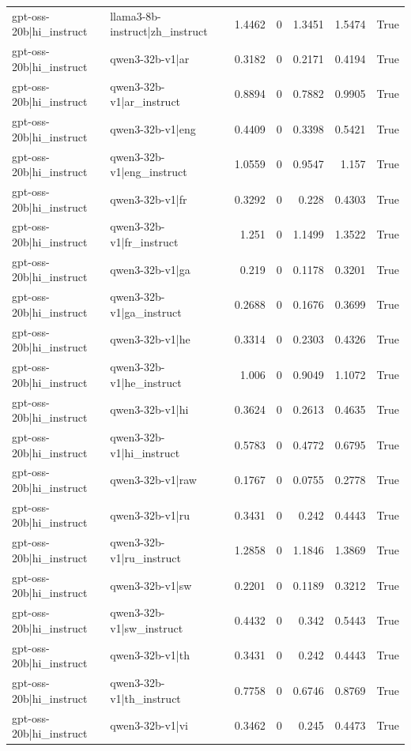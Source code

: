 \begin{table}
\begin{tabular}{l l r r r r l}
gpt-oss-20b|hi_instruct & llama3-8b-instruct|zh_instruct & 1.4462 & 0 & 1.3451 & 1.5474 & True \\
gpt-oss-20b|hi_instruct & qwen3-32b-v1|ar & 0.3182 & 0 & 0.2171 & 0.4194 & True \\
gpt-oss-20b|hi_instruct & qwen3-32b-v1|ar_instruct & 0.8894 & 0 & 0.7882 & 0.9905 & True \\
gpt-oss-20b|hi_instruct & qwen3-32b-v1|eng & 0.4409 & 0 & 0.3398 & 0.5421 & True \\
gpt-oss-20b|hi_instruct & qwen3-32b-v1|eng_instruct & 1.0559 & 0 & 0.9547 & 1.157 & True \\
gpt-oss-20b|hi_instruct & qwen3-32b-v1|fr & 0.3292 & 0 & 0.228 & 0.4303 & True \\
gpt-oss-20b|hi_instruct & qwen3-32b-v1|fr_instruct & 1.251 & 0 & 1.1499 & 1.3522 & True \\
gpt-oss-20b|hi_instruct & qwen3-32b-v1|ga & 0.219 & 0 & 0.1178 & 0.3201 & True \\
gpt-oss-20b|hi_instruct & qwen3-32b-v1|ga_instruct & 0.2688 & 0 & 0.1676 & 0.3699 & True \\
gpt-oss-20b|hi_instruct & qwen3-32b-v1|he & 0.3314 & 0 & 0.2303 & 0.4326 & True \\
gpt-oss-20b|hi_instruct & qwen3-32b-v1|he_instruct & 1.006 & 0 & 0.9049 & 1.1072 & True \\
gpt-oss-20b|hi_instruct & qwen3-32b-v1|hi & 0.3624 & 0 & 0.2613 & 0.4635 & True \\
gpt-oss-20b|hi_instruct & qwen3-32b-v1|hi_instruct & 0.5783 & 0 & 0.4772 & 0.6795 & True \\
gpt-oss-20b|hi_instruct & qwen3-32b-v1|raw & 0.1767 & 0 & 0.0755 & 0.2778 & True \\
gpt-oss-20b|hi_instruct & qwen3-32b-v1|ru & 0.3431 & 0 & 0.242 & 0.4443 & True \\
gpt-oss-20b|hi_instruct & qwen3-32b-v1|ru_instruct & 1.2858 & 0 & 1.1846 & 1.3869 & True \\
gpt-oss-20b|hi_instruct & qwen3-32b-v1|sw & 0.2201 & 0 & 0.1189 & 0.3212 & True \\
gpt-oss-20b|hi_instruct & qwen3-32b-v1|sw_instruct & 0.4432 & 0 & 0.342 & 0.5443 & True \\
gpt-oss-20b|hi_instruct & qwen3-32b-v1|th & 0.3431 & 0 & 0.242 & 0.4443 & True \\
gpt-oss-20b|hi_instruct & qwen3-32b-v1|th_instruct & 0.7758 & 0 & 0.6746 & 0.8769 & True \\
gpt-oss-20b|hi_instruct & qwen3-32b-v1|vi & 0.3462 & 0 & 0.245 & 0.4473 & True \\

\end{tabular}
\end{table}
